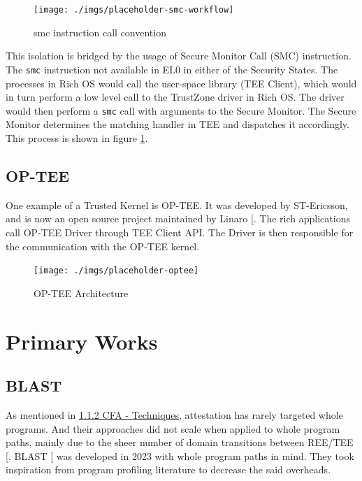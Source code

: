 \documentclass[a4paper, nobind]{templates/ociamthesis}
\begin{document}
\begin{figure}[H]

{\centering \texttt{[image: ./imgs/placeholder-smc-workflow]} 

}

\caption{smc instruction call convention}\label{fig:smc-convention}
\end{figure}

This isolation is bridged by the usage of Secure Monitor Call (SMC) instruction.
The \texttt{smc} instruction not available in EL0 in either of the Security States.
The processes in Rich OS would call the user-space library (TEE Client),
which would in turn perform a low level call to the TrustZone driver in Rich OS.
The driver would then perform a \texttt{smc} call with arguments to the Secure Monitor.
The Secure Monitor determines the matching handler in TEE and dispatches it accordingly.
This process is shown in figure \ref{fig:smc-convention}.

\subsection{OP-TEE}\label{op-tee}

One example of a Trusted Kernel is OP-TEE. It was developed by ST-Ericsson,
and is now an open source project maintained by Linaro {[}\citeproc{ref-optee}{38}{]}.
The rich applications call OP-TEE Driver through TEE Client API. The Driver
is then responsible for the communication with the OP-TEE kernel.

\begin{figure}[H]

{\centering \texttt{[image: ./imgs/placeholder-optee]} 

}

\caption{OP-TEE Architecture}\label{fig:optee-arch}
\end{figure}

\section{Primary Works}\label{primary-works}

\subsection{BLAST}\label{blast}

As mentioned in \hyperref[cfatechniques]{1.1.2 CFA - Techniques}, attestation has rarely targeted whole programs.
And their approaches did not scale when applied to whole program paths, mainly
due to the sheer number of domain transitions between REE/TEE {[}\citeproc{ref-blast}{55}{]}.
BLAST {[}\citeproc{ref-blast}{55}{]} was developed in 2023 with whole program paths in mind.
They took inspiration from program profiling literature to decrease the said overheads.
\end{document}
